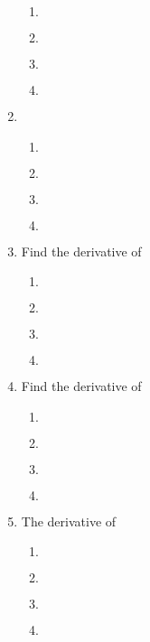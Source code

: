 \begin{multicols}{2}
\begin{enumerate}[label={\arabic*.}]
\begin{enumerate}[label={\Alph*.}]
	\item \(\)
	\item \(\)
	\item \(\)
	\item \(\)
	\end{enumerate}
\item
	\begin{enumerate}[label={\Alph*.}]
	\item \(\)
	\item \(\)
	\item \(\)
	\item \(\)
	\end{enumerate}
\item Find the derivative of 
	\begin{enumerate}[label={\Alph*.}]
	\item \(\)
	\item \(\)
	\item \(\)
	\item \(\)
	\end{enumerate}
\item Find the derivative of 
	\begin{enumerate}[label={\Alph*.}]
	\item \(\)
	\item \(\)
	\item \(\)
	\item \(\)
	\end{enumerate}
\item The derivative of 
	\begin{enumerate}[label={\Alph*.}]
	\item \(\)
	\item \(\)
	\item \(\)
	\item \(\)
	\end{enumerate}
\end{enumerate}
\end{multicols}